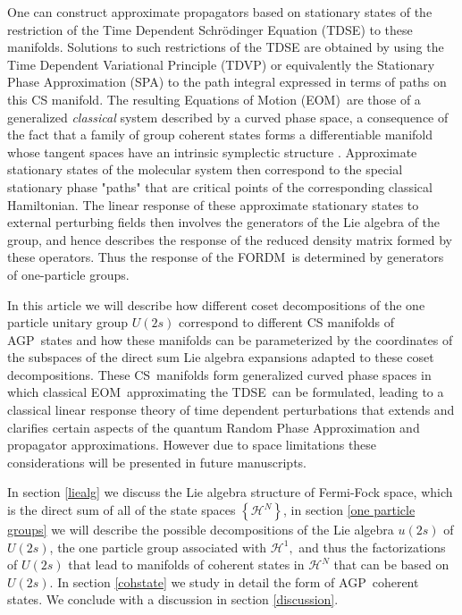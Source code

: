 \documentclass[aps,preprint]{revtex4}%
\begin{document}
One can construct approximate propagators based on stationary states of the
restriction of the Time Dependent Schr\"{o}dinger Equation (TDSE) to these
manifolds. Solutions to such restrictions of the TDSE are obtained by using
the Time Dependent Variational Principle (TDVP) \cite{Kramer81} or
equivalently the Stationary Phase Approximation (SPA) \cite{Schulman81} to the
path integral expressed in terms of paths on this CS manifold. The resulting
Equations of Motion (EOM)\ are those of a generalized \emph{classical }system
described by a curved phase space, a consequence of the fact that a family of
group coherent states forms a differentiable manifold \cite{Helgason78} whose
tangent spaces have an intrinsic symplectic structure \cite{Encyclo}.
Approximate stationary states of the molecular system then correspond to the
special stationary phase "paths" that are critical points of the corresponding
classical Hamiltonian. The linear response of these approximate stationary
states to external perturbing fields then involves the generators of the Lie
algebra of the group, and hence describes the response of the reduced density
matrix formed by these operators. Thus the response of the FORDM\ is
determined by generators of one-particle groups.

In this article we will describe how different coset decompositions of the one
particle unitary group $U(2s)$ correspond to different CS manifolds of
AGP\ states and how these manifolds can be parameterized by the coordinates of
the subspaces of the direct sum Lie algebra expansions adapted to these coset
decompositions. These CS\ manifolds form generalized curved phase spaces in
which classical EOM\ approximating the TDSE\ can be formulated, leading to a
classical linear response theory of time dependent perturbations that extends
and clarifies certain aspects of the quantum Random Phase Approximation and
propagator approximations. However due to space limitations these
considerations will be presented in future manuscripts.

In section \ref{liealg} we discuss the Lie algebra structure of Fermi-Fock
space, which is the direct sum of all of the state spaces $\left\{
\mathcal{H}^{N}\right\}  $, in section \ref{one particle groups} we will
describe the possible decompositions of the Lie algebra $u\left(  2s\right)  $
of $U(2s)$, the one particle group associated with $\mathcal{H}^{1},$ and thus
the factorizations of $U(2s)$ that lead to manifolds of coherent states in
$\mathcal{H}^{N}$ that can be based on $U(2s)$. In section \ref{cohstate} we
study in detail the form of AGP\ coherent states. We conclude with a
discussion in section \ref{discussion}.
\end{document}
